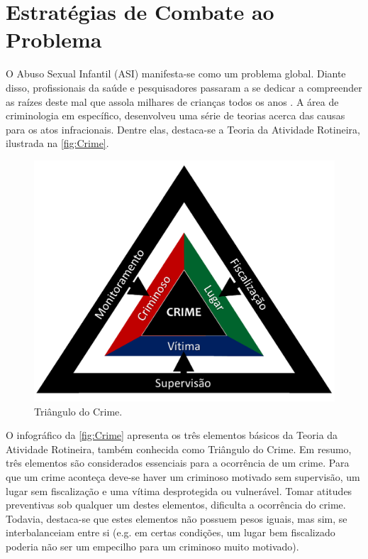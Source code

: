 \chapter{Estratégias de Combate ao Problema}\label{ch:Relacionados}


O Abuso Sexual Infantil (ASI) manifesta-se como um problema global. Diante disso, profissionais da saúde e pesquisadores passaram a se dedicar a compreender as raízes  deste mal que assola milhares de crianças todos os anos \cite{deslandes1994atenccao, dahlberg2006violencia, da2017violencia}. A área de criminologia em específico, desenvolveu uma série de teorias acerca das causas para os atos infracionais. Dentre elas, destaca-se a Teoria da Atividade Rotineira, ilustrada na \autoref{fig:Crime}.

\begin{figure}
  \caption{\label{fig:Crime}Triângulo do Crime.}
      \begin{center}
        \includegraphics[width=\linewidth]{./Figuras/TrianguloCrime.pdf}
      \end{center}
\end{figure}

O infográfico da \autoref{fig:Crime} apresenta os três elementos básicos da Teoria da Atividade Rotineira, também conhecida como Triângulo do Crime. Em resumo, três elementos são considerados essenciais para a ocorrência de um crime. Para que um crime aconteça deve-se haver um criminoso motivado sem supervisão, um lugar sem fiscalização e uma vítima desprotegida ou vulnerável. Tomar atitudes preventivas sob qualquer um destes elementos, dificulta a ocorrência do crime. Todavia, destaca-se que estes elementos não possuem pesos iguais, mas sim, se interbalanceiam entre si (e.g. em certas condições, um lugar bem fiscalizado poderia não ser um empecilho para um criminoso muito motivado).




